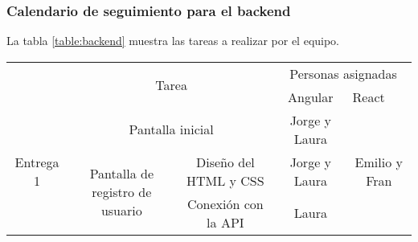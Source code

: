 \documentclass[11pt, a4paper, titlepage]{article}
\begin{document}
\subsubsection{Calendario de seguimiento para el backend}
 La tabla \ref{table:backend} muestra las tareas a realizar por el equipo. \newline

\begin{landscape}
\pagestyle{empty}
\begin{table}[hbt!]
\small
\centering
\begin{tabular}{c|ccll|cc|}
\cline{2-7}
\multirow{2}{*}{}                                 & \multicolumn{4}{c|}{\multirow{2}{*}{Tarea}}                                                                                                                                                                                      & \multicolumn{2}{c|}{Personas asignadas}                                      \\ \cline{6-7} 
                                                  & \multicolumn{4}{c|}{}                                                                                                                                                                                                            & \multicolumn{1}{c|}{Angular}                & \multicolumn{1}{l|}{React}     \\ \hline
\multicolumn{1}{|c|}{\multirow{14}{*}{Entrega 1}} & \multicolumn{4}{c|}{Pantalla inicial}                                                                                                                                                                                            & \multicolumn{1}{c|}{Jorge y Laura}          & \multirow{9}{*}{Emilio y Fran} \\ \cline{2-6}
\multicolumn{1}{|c|}{}                            & \multicolumn{1}{c|}{\multirow{2}{*}{Pantalla de registro de usuario}}                                           & \multicolumn{3}{c|}{Diseño del HTML y CSS}                                                                     & \multicolumn{1}{c|}{Jorge y Laura}          &                                \\ \cline{3-6}
\multicolumn{1}{|c|}{}                            & \multicolumn{1}{c|}{}                                                                                           & \multicolumn{3}{c|}{Conexión con la API}                                                                       & \multicolumn{1}{c|}{Laura}                  &                                \\ \cline{2-6}

\end{tabular}
\end{table}
\end{landscape}
\end{document}

